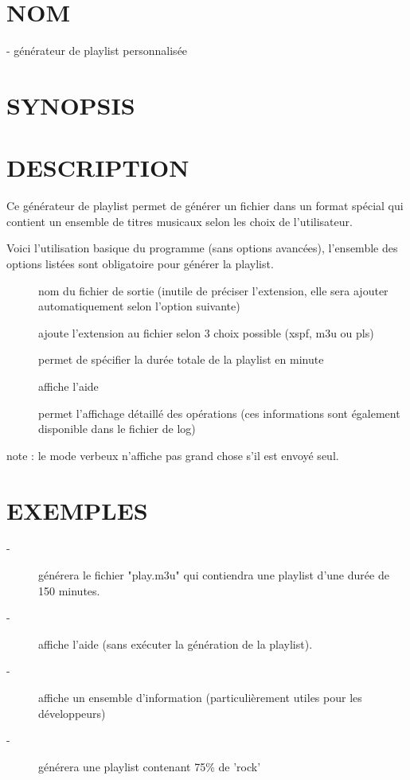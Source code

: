 \documentclass[french]{article}
\begin{document}
\section{NOM}
 - générateur de playlist personnalisée

\section{SYNOPSIS}
     

\section{DESCRIPTION}
Ce générateur de playlist permet de générer un fichier dans un format spécial qui contient un ensemble de titres musicaux selon les choix de l'utilisateur.

Voici l'utilisation basique du programme (sans options avancées), l'ensemble des options listées sont obligatoire pour générer la playlist.
\begin{description}
\item[] nom du fichier de sortie (inutile de préciser l'extension, elle sera ajouter automatiquement selon l'option suivante)
\item[] ajoute l'extension au fichier selon 3 choix possible (xspf, m3u ou pls)
\item[] permet de spécifier la durée totale de la playlist en minute
\item[] affiche l'aide
\item[] permet l'affichage détaillé des opérations (ces informations sont également disponible dans le fichier de log)
\end{description}
note : le mode verbeux n'affiche pas grand chose s'il est envoyé seul.

\section{EXEMPLES}
\begin{description}
\item[ -] générera le fichier "play.m3u" qui contiendra une playlist d'une durée de 150 minutes.
\item[ -] affiche l'aide (sans exécuter la génération de la playlist).
\item[ -] affiche un ensemble d'information (particulièrement utiles pour les développeurs)
\item[ -] générera une playlist contenant 75\% de 'rock'
\end{description}
\end{document}
